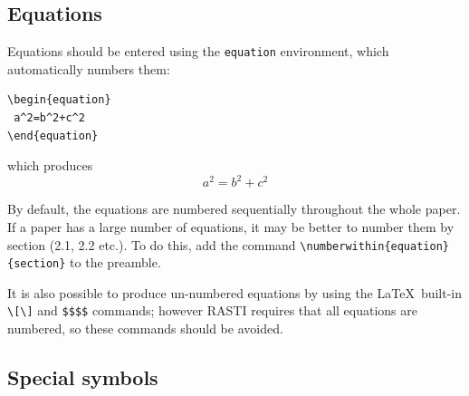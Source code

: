 \documentclass[fleqn,usenatbib,useAMS]{rasti}
\begin{document}
\subsection{Equations}
Equations should be entered using the \verb'equation' environment, which automatically numbers them:

\begin{verbatim}
\begin{equation}
 a^2=b^2+c^2
\end{equation}
\end{verbatim}
\noindent which produces
\begin{equation}
 a^2=b^2+c^2
\end{equation}

By default, the equations are numbered sequentially throughout the whole paper. If a paper has a large number of equations, it may be better to number them by section (2.1, 2.2 etc.). To do this, add the command \verb'\numberwithin{equation}{section}' to the preamble.

It is also possible to produce un-numbered equations by using the \LaTeX\ built-in \verb'\['\textellipsis\verb'\]' and \verb'$$'\textellipsis\verb'$$' commands; however RASTI requires that all equations are numbered, so these commands should be avoided.

\subsection{Special symbols}
\end{document}
